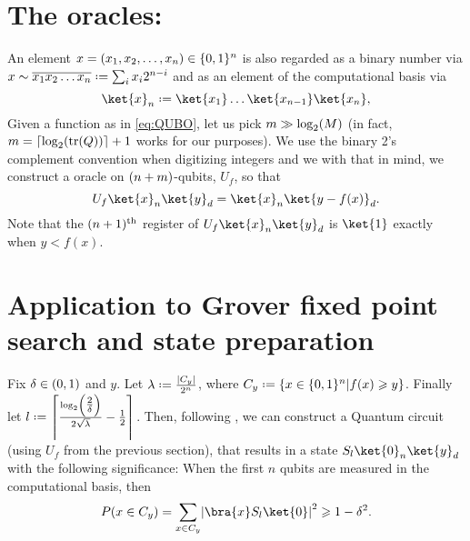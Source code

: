 \documentclass[reqno,oneside,12pt]{amsart}  %
\numberwithin{equation}{section}                %
\let\originalleft\left
\let\originalright\right
\renewcommand{\left}{\mathopen{}\mathclose\bgroup\originalleft}
\renewcommand{\right}{\aftergroup\egroup\originalright}
\def\({\mathopen{}\left(}
\def\){\right)\mathclose{}}
\newcommand*{\eqdef}{\mathrel{\vcenter{\baselineskip0.5ex \lineskiplimit0pt\hbox{.}\hbox{.}}}=}
\def\tr{\mathrm{tr}}
\begin{document}
\bigskip

\section{The oracles:}

An element $x = \( x_1, x_2, \ldots, x_n \) \in \{ 0, 1 \}^n$ is also regarded as a binary number via $x \sim \overline{x_1 x_2 \ldots x_n} \eqdef \sum_i x_i 2^{n - i}$ and as an element of the computational basis via
\begin{equation}
   \ket{x}_n \eqdef \ket{x_1} \ldots \ket{x_{n - 1}} \ket{x_n},
\end{equation}
Given a function as in \cref{eq:QUBO}, let us pick $m \gg \log_2 \( M \)$ (in fact, $m = \left\lceil \log_2 \( \tr \( Q \) \) \right\rceil + 1$ works for our purposes). We use the binary 2’s complement convention when digitizing integers and we with that in mind, we construct a oracle on $\( n + m \)$-qubits, $U_f$, so that
\begin{equation}
   U_f \ket{x}_n \ket{y}_d = \ket{x}_n \ket{y - f (x)}_d.
\end{equation}
Note that the $\( n + 1 \)^{\mathrm{th}}$ register of $U_f \ket{x}_n \ket{y}_d$ is $\ket{1}$ exactly when $y < f (x)$.

\medskip

\section{Application to Grover fixed point search and state preparation}

Fix $\delta \in \( 0, 1 \)$ and $y$. Let $\lambda \eqdef \tfrac{\left| C_y \right|}{2^n}$, where $C_y \eqdef \left\{ x \in \{ 0, 1 \}^n \middle| f (x) \geqslant y \right\}$. Finally let $l \eqdef \left\lceil \tfrac{\log_2 \( \tfrac{2}{\delta} \)}{2 \sqrt{\lambda}} - \tfrac{1}{2} \right\rceil$. Then, following \cite{yoder_fixed-point_2014}, we can construct a Quantum circuit (using $U_f$ from the previous section), that results in a state $S_l \ket{0}_n \ket{y}_d$ with the following significance: When the first $n$ qubits are measured in the computational basis, then
\begin{equation}
   P \( x \in C_y \) = \sum_{x \in C_y} \left| \bra{x} S_l \ket{0} \right|^2 \geqslant 1 - \delta^2.
\end{equation}
\end{document}
